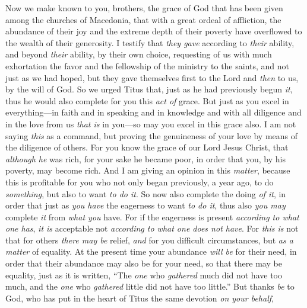 \begin{biblechapter} %
 Now we make known to you, brothers, the grace of God that has been given among the churches of Macedonia,
\verse that with a great ordeal of affliction, the abundance of their joy and the extreme depth of their poverty have overflowed to the wealth of their generosity.
\verse I testify that \textit{they gave} according to \textit{their} ability, and beyond \textit{their} ability, by their own choice,
\verse requesting of us with much exhortation the favor and the fellowship of the ministry to the saints,
\verse and not just as we had hoped, but they gave themselves first to the Lord and \textit{then} to us, by the will of God.
\verse So we urged Titus that, just as he had previously begun \textit{it}, thus he would also complete for you this \textit{act of} grace.
\verse But just as you excel in everything—in faith and in speaking and in knowledge and with all diligence and in the love from us \textit{that is} in you—so may you excel in this grace also.
\verse I am not saying \textit{this} as a command, but proving the genuineness of your love by means of the diligence of others.
\verse For you know the grace of our Lord Jesus Christ, that \textit{although he} was rich, for your sake he became poor, in order that you, by his poverty, may become rich.
\verse And I am giving an opinion in this \textit{matter}, because this is profitable for you who not only began previously, a year ago, to do \textit{something}, but also to want \textit{to do it}.
\verse So now also complete the doing \textit{of it}, in order that just as \textit{you have} the eagerness to want \textit{to do it}, thus also \textit{you may} complete \textit{it} from \textit{what you} have.
\verse For if the eagerness is present \textit{according to what one has}, \textit{it is} acceptable not \textit{according to what one does not have}.
\verse For \textit{this is} not that for others \textit{there may be} relief, \textit{and} for you difficult circumstances, but \textit{as a matter} of equality.
\verse At the present time your abundance \textit{will be} for their need, in order that their abundance may also be for your need, so that there may be equality,
\verse just as it is written, “The \textit{one} who \textit{gathered} much did not have too much, and the \textit{one} who \textit{gathered} little did not have too little.”
 But thanks \textit{be} to God, who has put in the heart of Titus the same devotion \textit{on your behalf},

\end{biblechapter}
